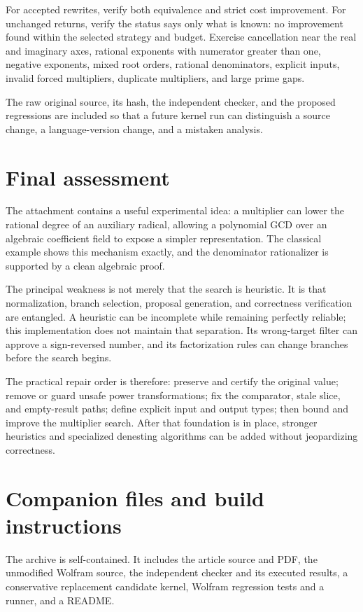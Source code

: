 \documentclass[11pt,letterpaper]{article}
\newcommand{\code}[1]{\texttt{\detokenize{#1}}}
\theoremstyle{definition}
\begin{document}
For accepted rewrites, verify both equivalence and strict cost improvement. For
unchanged returns, verify the status says only what is known: no improvement found
within the selected strategy and budget. Exercise cancellation near the real and
imaginary axes, rational exponents with numerator greater than one, negative
exponents, mixed root orders, rational denominators, explicit \code{Root} inputs,
invalid forced multipliers, duplicate multipliers, and large prime gaps.

The raw original source, its hash, the independent checker, and the proposed
regressions are included so that a future kernel run can distinguish a source
change, a language-version change, and a mistaken analysis.

\section{Final assessment}
The attachment contains a useful experimental idea: a multiplier can lower the
rational degree of an auxiliary radical, allowing a polynomial GCD over an algebraic
coefficient field to expose a simpler representation. The classical example shows
this mechanism exactly, and the denominator rationalizer is supported by a clean
algebraic proof.

The principal weakness is not merely that the search is heuristic. It is that
normalization, branch selection, proposal generation, and correctness verification
are entangled. A heuristic can be incomplete while remaining perfectly reliable;
this implementation does not maintain that separation. Its wrong-target filter
can approve a sign-reversed number, and its factorization rules can change branches
before the search begins.

The practical repair order is therefore: preserve and certify the original value;
remove or guard unsafe power transformations; fix the comparator, stale slice, and
empty-result paths; define explicit input and output types; then bound and improve
the multiplier search. After that foundation is in place, stronger heuristics and
specialized denesting algorithms can be added without jeopardizing correctness.

\appendix
\section{Companion files and build instructions}
The archive is self-contained. It includes the article source and PDF, the unmodified
Wolfram source, the independent checker and its executed results, a conservative
replacement candidate kernel, Wolfram regression tests and a runner, and a README.
\end{document}
